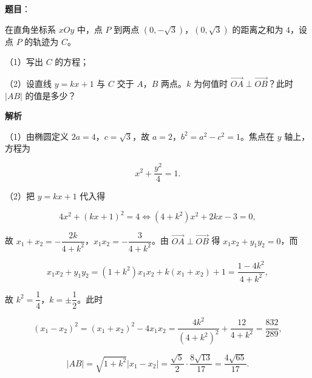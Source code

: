 \begin{answer}

\textbf{题目}：

在直角坐标系 $xOy$ 中，点 $P$ 到两点 $(0,-\sqrt3)$，$(0,\sqrt3)$ 的距离之和为 $4$，设点 $P$ 的轨迹为 $C$。

（1）写出 $C$ 的方程；

（2）设直线 $y=kx+1$ 与 $C$ 交于 $A$，$B$ 两点。$k$ 为何值时 $\overrightarrow{OA}\perp\overrightarrow{OB}$？此时 $\left|AB\right|$ 的值是多少？

\textbf{解析}

（1）由椭圆定义 $2a=4$，$c=\sqrt3$，故 $a=2$，$b^2=a^2-c^2=1$。焦点在 $y$ 轴上，方程为

\nopagebreak[4]
\[x^2+\frac{y^2}{4}=1.\]

（2）把 $y=kx+1$ 代入得

\nopagebreak[4]
\[4x^2+(kx+1)^2=4\iff(4+k^2)x^2+2kx-3=0,\]

故 $x_1+x_2=-\dfrac{2k}{4+k^2}$，$x_1x_2=-\dfrac3{4+k^2}$。由 $\overrightarrow{OA}\perp\overrightarrow{OB}$ 得 $x_1x_2+y_1y_2=0$，而

\nopagebreak[4]
\[x_1x_2+y_1y_2=(1+k^2)x_1x_2+k(x_1+x_2)+1=\frac{1-4k^2}{4+k^2},\]

故 $k^2=\dfrac14$，$k=\pm\dfrac12$。此时

\nopagebreak[4]
\[(x_1-x_2)^2=(x_1+x_2)^2-4x_1x_2=\frac{4k^2}{(4+k^2)^2}+\frac{12}{4+k^2}=\frac{832}{289},\]

\nopagebreak[4]
\[\left|AB\right|=\sqrt{1+k^2}\left|x_1-x_2\right|=\frac{\sqrt5}{2}\cdot\frac{8\sqrt{13}}{17}=\frac{4\sqrt{65}}{17}.\]


\end{answer}
